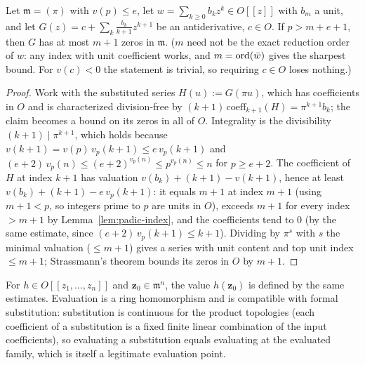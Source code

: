 \begin{theorem}
\label{thm:antideriv-zeros}
\leanok
{}
Let $\mathfrak m = (\pi)$ with $v(p) \le e$, let
$w = \sum_{k\ge0} b_k z^k \in O[[z]]$ with $b_m$ a unit, and let
$G(z) = c + \sum_k \tfrac{b_k}{k+1} z^{k+1}$ be an antiderivative, $c \in O$. If
$p > m + e + 1$, then $G$ has at most $m + 1$ zeros in $\mathfrak m$. ($m$ need not be
the exact reduction order of $w$: any index with unit coefficient works, and
$m = \operatorname{ord}(\bar w)$ gives the sharpest bound. For $v(c) < 0$ the statement is trivial, so
requiring $c \in O$ loses nothing.)
\end{theorem}
\begin{proof}
\leanok
{}
Work with the substituted series $H(u) := G(\pi u)$, which has coefficients in $O$ and is
characterized division-free by $(k+1)\,\mathrm{coeff}_{k+1}(H) = \pi^{k+1} b_k$; the claim
becomes a bound on its zeros in all of $O$. Integrality is the divisibility
$(k+1) \mid \pi^{k+1}$, which holds because $v(k+1) = v(p)\,v_p(k+1) \le e\,v_p(k+1)$ and
$(e+2)\,v_p(n) \le (e+2)^{v_p(n)} \le p^{v_p(n)} \le n$ for $p \ge e+2$. The coefficient of
$H$ at index $k+1$ has valuation $v(b_k) + (k+1) - v(k+1)$, hence at least
$v(b_k) + (k+1) - e\,v_p(k+1)$: it equals $m+1$ at index $m+1$ (using $m + 1 < p$, so
integers prime to $p$ are units in $O$), exceeds $m+1$ for every index $> m+1$ by
Lemma~\ref{lem:padic-index}, and the coefficients tend to $0$ (by the same estimate, since
$(e+2)\,v_p(k+1) \le k+1$). Dividing by $\pi^{s}$ with $s$ the minimal valuation ($\le m+1$)
gives a series with unit content and top unit index $\le m+1$; Strassmann's theorem
bounds its zeros in $O$ by $m+1$.
\end{proof}

\begin{definition}
\label{def:mv-eval}
\leanok
{}
For $h \in O[[z_1,\dots,z_n]]$ and $\mathbf z_0 \in \mathfrak m^n$, the value
$h(\mathbf z_0)$ is defined by the same estimates. Evaluation is a ring homomorphism and
is compatible with formal substitution: substitution is continuous for the product
topologies (each coefficient of a substitution is a fixed finite linear combination of
the input coefficients), so evaluating a substitution equals evaluating at the evaluated
family, which is itself a legitimate evaluation point.
\end{definition}

